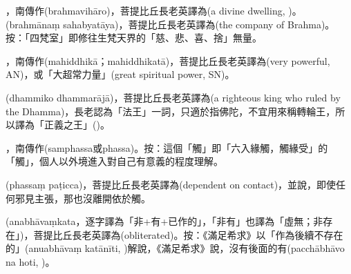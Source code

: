\startitemgroup[noteitems]
\item{}，南傳作(brahmavihāro)，菩提比丘長老英譯為(a divine dwelling, )。(brahmānaṃ sahabyatāya)，菩提比丘長老英譯為(the company of Brahma)。按：「四梵室」即修往生梵天界的「慈、悲、喜、捨」無量。
\stopitemgroup

\startitemgroup[noteitems]
\item{}，南傳作(mahiddhikā；mahiddhikatā)，菩提比丘長老英譯為(very powerful, AN)，或「大超常力量」(great spiritual power, SN)。
\stopitemgroup

\startitemgroup[noteitems]
\item{}(dhammiko dhammarājā)，菩提比丘長老英譯為(a righteous king who ruled by the Dhamma)，長老認為「法王」一詞，只適於指佛陀，不宜用來稱轉輪王，所以譯為「正義之王」()。
\stopitemgroup

\startitemgroup[noteitems]
\item{}，南傳作(samphassa或phassa)。按：這個「觸」即「六入緣觸，觸緣受」的「觸」，個人以外境進入對自己有意義的程度理解。
\item{}(phassaṃ paṭicca)，菩提比丘長老英譯為(dependent on contact)，並說，即使任何邪見主張，那也沒離開依於觸。
\stopitemgroup

\startitemgroup[noteitems]
\item{}(anabhāvaṃkata，逐字譯為「非+有+已作的」，「非有」也譯為「虛無；非存在」)，菩提比丘長老英譯為(obliterated)。按：《滿足希求》以「作為後續不存在的」(anuabhāvaṃ katānīti, )解說，《滿足希求》說，沒有後面的有(pacchābhāvo na hoti, )。
\stopitemgroup

